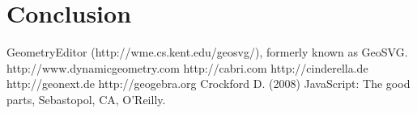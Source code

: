 \documentclass[12pt,a4paper]{article}%
\begin{document}
\section{Conclusion}

\begin{thebibliography}{99}
     GeometryEditor (http://wme.cs.kent.edu/geosvg/), formerly known as GeoSVG.
     http://www.dynamicgeometry.com
     http://cabri.com 
     http://cinderella.de 
     http://geonext.de 
     http://geogebra.org
     Crockford D. (2008) JavaScript: The good parts, Sebastopol, CA, O'Reilly.
\end{thebibliography}
\end{document}

